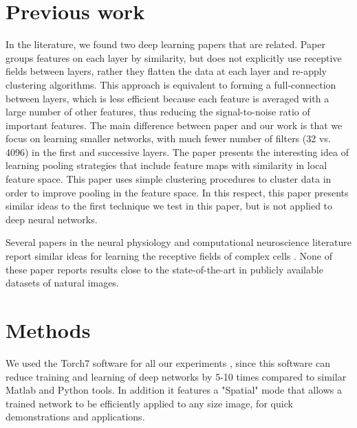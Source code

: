 \documentclass{article} %
\begin{document}
\section{Previous work}
\label{sec-priorart}

In the literature, we found two deep learning papers that are related. 
Paper \cite{coates2012learning} groups features on each layer by similarity, but does not explicitly use receptive fields between layers, 
rather they flatten the data at each layer and re-apply clustering algorithms. 
This approach is equivalent to forming a full-connection between layers, 
which is less efficient because each feature is averaged with a large number of other features, thus reducing the signal-to-noise ratio of important features.
The main difference between paper \cite{coates2012learning} and our work is that we focus on learning smaller networks,
with much fewer number of filters (32 vs. 4096) in the first and successive layers. 
The paper \cite{boureau_2011} presents the interesting idea of learning pooling strategies that include feature maps with similarity in local feature space. 
This paper uses simple clustering procedures to cluster data in order to improve pooling in the feature space. 
In this respect, this paper presents similar ideas to the first technique we test in this paper, but is not applied to deep neural networks.

Several papers in the neural physiology and computational neuroscience literature report similar ideas for learning the receptive fields of complex cells \cite{masquelier2007learning,spratling2005learning,wiskott2002slow,wallis1997invariant}. None of these paper reports results close to the state-of-the-art in publicly available datasets of natural images.




\section{Methods}
\label{sec-methods}

We used the Torch7 software for all our experiments \cite{collobert_torch7_2011}, since this software can reduce training and learning of deep networks
by 5-10 times compared to similar Matlab and Python tools.
In addition it features a "Spatial" mode that allows a trained network to be efficiently applied to any size image, for quick demonstrations and applications.
\end{document}
